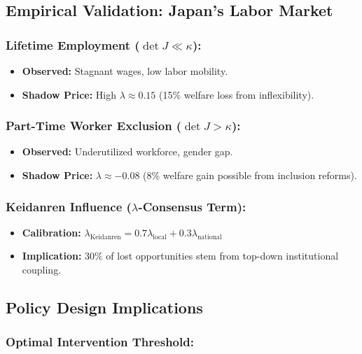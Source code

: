 \documentclass[10pt]{article}
\theoremstyle{definition}
\begin{document}
\subsection{Empirical Validation: Japan's Labor Market}

\subsubsection{Lifetime Employment ($\det J \ll \kappa$):}

\begin{itemize}
    \item \textbf{Observed:} Stagnant wages, low labor mobility.
    \item \textbf{Shadow Price:} High $\lambda \approx 0.15$ (15\% welfare loss from inflexibility).
\end{itemize}

\subsubsection{Part-Time Worker Exclusion ($\det J > \kappa$):}

\begin{itemize}
    \item \textbf{Observed:} Underutilized workforce, gender gap.
    \item \textbf{Shadow Price:} $\lambda \approx -0.08$ (8\% welfare gain possible from inclusion reforms).
\end{itemize}

\subsubsection{Keidanren Influence ($\lambda$-Consensus Term):}

\begin{itemize}
    \item \textbf{Calibration:} $\lambda_{\text{Keidanren}} = 0.7\lambda_{\text{local}} + 0.3\lambda_{\text{national}}$
    \item \textbf{Implication:} 30\% of lost opportunities stem from top-down institutional coupling.
\end{itemize}

\subsection{Policy Design Implications}

\subsubsection{Optimal Intervention Threshold:}
\end{document}
